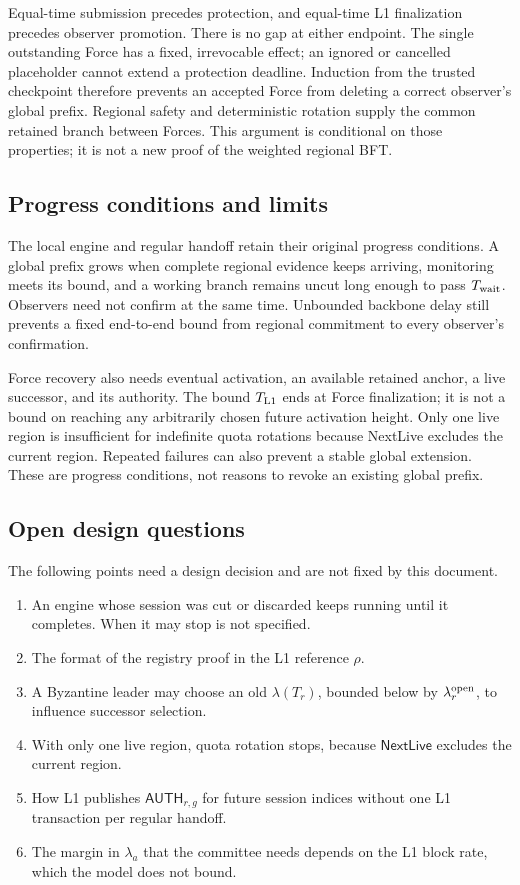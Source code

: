 \documentclass[11pt,a4paper]{article}
\newcommand{\Twait}{T_{\rm wait}}
\newcommand{\tagg}[1]{\ensuremath{\mathsf{#1}}}
\begin{document}
Equal-time submission precedes protection, and equal-time L1
finalization precedes observer promotion. There is no gap at either
endpoint. The single outstanding Force has a fixed, irrevocable effect;
an ignored or cancelled placeholder cannot extend a protection deadline.
Induction from the trusted checkpoint therefore prevents an accepted
Force from deleting a correct observer's global prefix. Regional safety
and deterministic rotation supply the common retained branch between
Forces. This argument is conditional on those properties; it is not a
new proof of the weighted regional BFT.

\subsection{Progress conditions and limits}
The local engine and regular handoff retain their original progress
conditions. A global prefix grows when complete regional evidence keeps
arriving, monitoring meets its bound, and a working branch remains
uncut long enough to pass $\Twait$. Observers need not confirm at the same
time. Unbounded backbone delay still prevents a fixed end-to-end bound
from regional commitment to every observer's confirmation.

Force recovery also needs eventual activation, an available retained
anchor, a live successor, and its authority. The bound $T_{\rm L1}$ ends
at Force finalization; it is not a bound on reaching any arbitrarily
chosen future activation height. Only one live region is insufficient
for indefinite quota rotations because NextLive excludes the current
region. Repeated failures can also prevent a stable global extension.
These are progress conditions, not reasons to revoke an existing global
prefix.

\subsection{Open design questions}
The following points need a design decision and are not fixed by this
document.
\begin{enumerate}[label=(\arabic*)]
\item An engine whose session was cut or discarded keeps running until it
completes. When it may stop is not specified.
\item The format of the registry proof in the L1 reference $\rho$.
\item A Byzantine leader may choose an old $\lambda(T_r)$, bounded below
by $\lambda^{\rm open}_r$, to influence successor selection.
\item With only one live region, quota rotation stops, because
$\tagg{NextLive}$ excludes the current region.
\item How L1 publishes $\tagg{AUTH}_{r,g}$ for future session indices
without one L1 transaction per regular handoff.
\item The margin in $\lambda_a$ that the committee needs depends on the
L1 block rate, which the model does not bound.
\end{enumerate}
\end{document}
